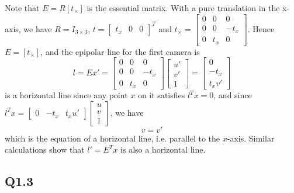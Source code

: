 \documentclass{scrbook}
\begin{document}
Note that $E=R\left[t_{\times }\right]$ is the essential matrix. With a pure translation in the x-axis, we have $R=I_{3\times 3}$, $t=\left[\begin{array}{ccc}
t_{x} & 0 & 0
\end{array}\right]^{T}$ and $t_{\times }=\left[\begin{array}{ccc}
0 & 0 & 0\\
0 & 0 & -t_{x}\\
0 & t_{x} & 0
\end{array}\right]$. Hence $E=[t_{\times }]$, and the epipolar line for the first camera is
\begin{equation*}
l=Ex'=\left[\begin{array}{ccc}
0 & 0 & 0\\
0 & 0 & -t_{x}\\
0 & t_{x} & 0
\end{array}\right]\left[\begin{array}{c}
u'\\
v'\\
1
\end{array}\right]=\left[\begin{array}{c}
0\\
-t_{x}\\
t_{x}v'
\end{array}\right]
\end{equation*}
is a horizontal line since any point $x$ on it satisfies $l^{T}x=0$, and since $l^{T}x=\left[\begin{array}{ccc}
0 & -t_{x} & t_{x}u'
\end{array}\right]\left[\begin{array}{c}
u\\
v\\
1
\end{array}\right]$, we have 
\begin{equation*}
v=v'
\end{equation*}
which is the equation of a horizontal line, i.e. parallel to the $x$-axis. Similar calculations show that $l'=E^{T}x$ is also a horizontal line.

\subsection{Q1.3}
\end{document}
